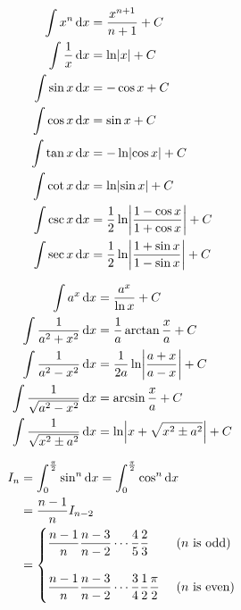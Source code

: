 \begin{multicols}{2}
\begin{equation*}
    \begin{aligned}
        \int x^n \dif x &= \frac{x^{n+1}}{n+1} + C \\
        \int \frac{1}{x} \dif x &= \ln \absolutevalue{x} + C \\
        \int \sin x \dif x &= -\cos x + C \\
        \int \cos x \dif x &= \sin x + C \\
        \int \tan x \dif x &= - \ln \absolutevalue{\cos x} + C \\
        \int \cot x \dif x &= \ln \absolutevalue{\sin x} + C \\
        \int \csc x \dif x &= \frac{1}{2} \ln \absolutevalue{\frac{1 - \cos x}{1 + \cos x}} + C \\
        \int \sec x \dif x &= \frac{1}{2} \ln \absolutevalue{\frac{1+\sin x}{1- \sin x}} + C \\      
    \end{aligned}
\end{equation*}

\begin{equation*}
    \begin{aligned}
        \int a^x \dif x &= \frac{a^x}{\ln x} + C \\
        \int \frac{1}{a^2 + x^2} \dif x &= \frac{1}{a} \arctan \frac{x}{a} + C \\
        \int \frac{1}{a^2 - x^2} \dif x &= \frac{1}{2a} \ln \absolutevalue{\frac{a+x}{a-x}} + C \\
        \int \frac{1}{\sqrt{a^2 - x^2}} \dif x &= \arcsin \frac{x}{a} + C \\
        \int \frac{1}{\sqrt{x^2 \pm a^2}} \dif x &= \ln \absolutevalue{x + \sqrt{x^2 \pm a^2}} + C \\         
    \end{aligned}
\end{equation*}

\begin{equation*}
    \begin{aligned}
        I_n &= \int_0^\frac{\pi}{2} \sin^n \dif x = \int_0^\frac{\pi}{2} \cos^n \dif x  \\
        &= \frac{n-1}{n} I_{n-2} \\
        &= \begin{cases}
            \displaystyle \frac{n-1}{n} \frac{n-3}{n-2} \cdots \frac{4}{5} \frac{2}{3} & \text{ (} n \text{ is odd)}\\
            \\
            \displaystyle \frac{n-1}{n} \frac{n-3}{n-2} \cdots \frac{3}{4} \frac{1}{2} \frac{\pi}{2} & \text{ (} n \text{ is even)}
        \end{cases}
    \end{aligned}
\end{equation*}    
\end{multicols}


